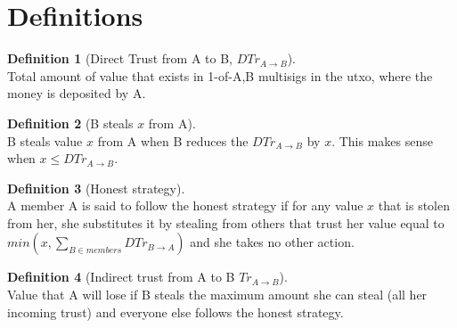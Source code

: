 \documentclass[11pt]{article}
\theoremstyle{definition}
\newtheorem{definition}{Definition}[section]
\theoremstyle{corollary}
\begin{document}
  \section{Definitions}
      \begin{definition}[Direct Trust from A to B, $DTr_{A \rightarrow B}$] \ \\
         Total amount of value that exists in 1-of-A,B multisigs in the utxo, where the money is deposited by A.
      \end{definition}
      \begin{definition}[B steals $x$ from A] \ \\
         B steals value $x$ from A when B reduces the $DTr_{A \rightarrow B}$ by $x$. This makes sense when 
         $x \leq DTr_{A \rightarrow B}$.
      \end{definition}
      \begin{definition}[Honest strategy] \ \\
         A member A is said to follow the honest strategy if for any value $x$ that is stolen from her, she
         substitutes it by stealing from others that trust her value equal to
         $min(x,\sum_{B \in members}{DTr_{B \rightarrow A}})$ and she takes no other action.
      \end{definition}
      \begin{definition}[Indirect trust from A to B $Tr_{A \rightarrow B}$] \ \\
         Value that A will lose if B steals the maximum amount she can steal (all her incoming trust) and everyone
         else follows the honest strategy.
      \end{definition}
\end{document}
